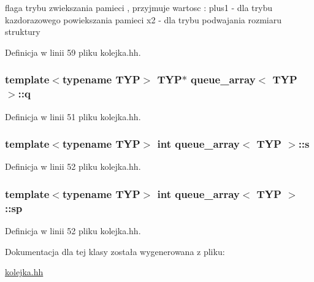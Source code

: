 flaga trybu zwiekszania pamieci , przyjmuje wartosc \-: plus1 -\/ dla trybu kazdorazowego powiekszania pamieci x2 -\/ dla trybu podwajania rozmiaru struktury 



\-Definicja w linii 59 pliku kolejka.\-hh.

\hypertarget{classqueue__array_a073323517389c0d97534b90682317ce3}{
\subsubsection[{q}]{\setlength{\rightskip}{0pt plus 5cm}template$<$typename \-T\-Y\-P$>$ \-T\-Y\-P$\ast$ {\bf queue\-\_\-array}$<$ \-T\-Y\-P $>$\-::{\bf q}}}\label{classqueue__array_a073323517389c0d97534b90682317ce3}


\-Definicja w linii 51 pliku kolejka.\-hh.

\hypertarget{classqueue__array_a87d275726c2f69acb8ea9f0b3ab899f6}{
\subsubsection[{s}]{\setlength{\rightskip}{0pt plus 5cm}template$<$typename \-T\-Y\-P$>$ int {\bf queue\-\_\-array}$<$ \-T\-Y\-P $>$\-::{\bf s}}}\label{classqueue__array_a87d275726c2f69acb8ea9f0b3ab899f6}


\-Definicja w linii 52 pliku kolejka.\-hh.

\hypertarget{classqueue__array_a94cdc73c1df75d4fe0c75a852528cde9}{
\subsubsection[{sp}]{\setlength{\rightskip}{0pt plus 5cm}template$<$typename \-T\-Y\-P$>$ int {\bf queue\-\_\-array}$<$ \-T\-Y\-P $>$\-::{\bf sp}}}\label{classqueue__array_a94cdc73c1df75d4fe0c75a852528cde9}


\-Definicja w linii 52 pliku kolejka.\-hh.



\-Dokumentacja dla tej klasy została wygenerowana z pliku\-:\begin{DoxyCompactItemize}
\item 
\hyperlink{kolejka_8hh}{kolejka.\-hh}\end{DoxyCompactItemize}
